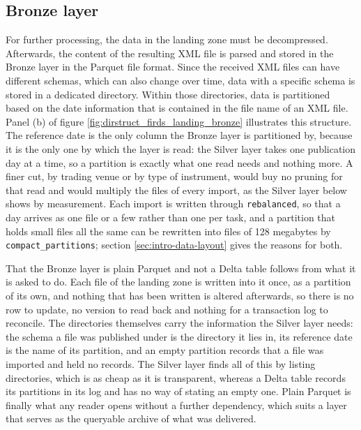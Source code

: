 \subsection{Bronze layer\label{sec:firds-bronze}}

For further processing, the data in the landing zone must be decompressed. Afterwards, the content of the resulting XML file is parsed and stored in the Bronze layer in the Parquet file format. Since the received XML files can have different schemas, which can also change over time, data with a specific schema is stored in a dedicated directory. Within those directories, data is partitioned based on the date information that is contained in the file name of an XML file. Panel (b) of figure \ref{fig:dirstruct_firds_landing_bronze} illustrates this structure. The reference date is the only column the Bronze layer is partitioned by, because it is the only one by which the layer is read: the Silver layer takes one publication day at a time, so a partition is exactly what one read needs and nothing more. A finer cut, by trading venue or by type of instrument, would buy no pruning for that read and would multiply the files of every import, as the Silver layer below shows by measurement. Each import is written through \verb|rebalanced|, so that a day arrives as one file or a few rather than one per task, and a partition that holds small files all the same can be rewritten into files of 128 megabytes by \verb|compact_partitions|; section \ref{sec:intro-data-layout} gives the reasons for both.

That the Bronze layer is plain Parquet and not a Delta table follows from what it is asked to do. Each file of the landing zone is written into it once, as a partition of its own, and nothing that has been written is altered afterwards, so there is no row to update, no version to read back and nothing for a transaction log to reconcile. The directories themselves carry the information the Silver layer needs: the schema a file was published under is the directory it lies in, its reference date is the name of its partition, and an empty partition records that a file was imported and held no records. The Silver layer finds all of this by listing directories, which is as cheap as it is transparent, whereas a Delta table records its partitions in its log and has no way of stating an empty one. Plain Parquet is finally what any reader opens without a further dependency, which suits a layer that serves as the queryable archive of what was delivered.

